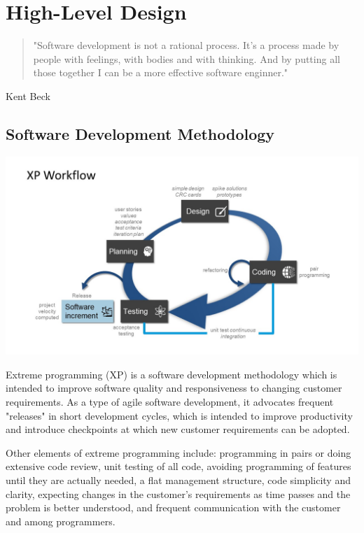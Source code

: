 \chapter{High-Level Design}

\begin{quotation}
"Software development is not a rational process. It's a process made by people with feelings,
with bodies and with thinking. And by putting all those together I can be a more effective
software enginner."
\end{quotation}
\begin{flushright}
Kent Beck
\end{flushright}

\section{Software Development Methodology}

\begin{center}
\includegraphics[scale=0.5]{images/xtreme.jpg} 
\end{center}


Extreme programming (XP) is a software development methodology which is intended to improve software quality and responsiveness to changing customer requirements. As a type of agile software development, it advocates frequent "releases" in short development cycles, which is intended to improve productivity and introduce checkpoints at which new customer requirements can be adopted.

Other elements of extreme programming include: programming in pairs or doing extensive code review, unit testing of all code, avoiding programming of features until they are actually needed, a flat management structure, code simplicity and clarity, expecting changes in the customer's requirements as time passes and the problem is better understood, and frequent communication with the customer and among programmers.

